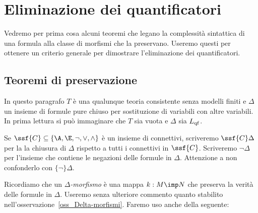 \chapter{Eliminazione dei quantificatori}
\label{eliminazione}
\def\ceq#1#2#3{\noindent\smash{\parbox[t]{20ex}{$\displaystyle #1$}}\parbox{6ex}{\hfil $#2$}{$\displaystyle #3$}}

Vedremo per prima cosa alcuni teoremi che legano la complessit\`a sintattica di una formula alla classe di morfismi che la preservano. Useremo questi per ottenere un criterio generale per dimostrare l'eliminazione dei quantificatori. 

 
\section{Teoremi di preservazione}
\label{TeoremidiPreservazione}

In questo paragrafo $T$ \`e una qualunque teoria consistente senza modelli finiti e $\Delta$ un insieme di formule pure chiuso per sostituzione di variabili con altre variabili. In prima lettura si pu\`o immaginare che $T$ sia vuota e $\Delta$ sia $L_{\rm qf}$. 

Se $\ssf{C}\subseteq\{\A,\E,\neg,\vee,\wedge\}$ \`e un insieme di connettivi, scriveremo \emph{$\ssf{C}\Delta$} per la la chiusura di $\Delta$ rispetto a tutti i connettivi in $\ssf{C}$. Scriveremo \emph{$\neg\Delta$} per l'insieme che contiene le negazioni delle formule in $\Delta$. Attenzione a non confonderlo con $\{\neg\}\Delta$.





% 
% 



Ricordiamo che un \emph{$\Delta$-morfismo\/} \`e una mappa $k:M\imp N$ che preserva la verit\`a delle formule in $\Delta$. Useremo senza ulteriore commento quanto stabilito nell'osservazione~\ref{oss_Delta-morfismi}. Faremo uso anche della seguente: 

